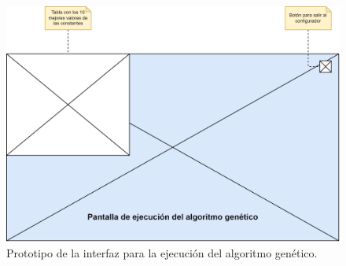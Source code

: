  \begin{figure}[H]
    \centering
    \includegraphics[width=\textwidth]{imagenes/proto-ga.png}
    \caption{Prototipo de la interfaz para la ejecución del algoritmo genético.}
    \label{fig:proto-ga}
 \end{figure}